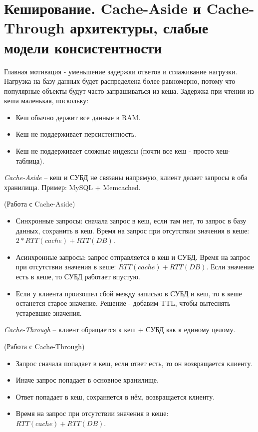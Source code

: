 \section{Кеширование. Cache-Aside и Cache-Through архитектуры, слабые модели консистентности}

Главная мотивация - уменьшение задержки ответов и сглаживание нагрузки.
Нагрузка на базу данных будет распределена более равномерно, потому что популярные объекты будут часто запрашиваться из кеша.
Задержка при чтении из кеша маленькая, поскольку:
\begin{itemize}
    \item Кеш обычно держит все данные в RAM.
    \item Кеш не поддерживает персистентность.
    \item Кеш не поддерживает сложные индексы (почти все кеш - просто хеш-таблица).
\end{itemize}

\begin{definition}
    \textit{Cache-Aside} -- кеш и СУБД не связаны напрямую, клиент делает запросы в оба хранилища. Пример: MySQL + Memcached.
\end{definition}

\begin{algorithm}(Работа с Cache-Aside)
    \begin{itemize}
        \item Синхронные запросы: сначала запрос в кеш, если там нет, то запрос в базу данных, сохранить в кеш.
            Время на запрос при отсутствии значения в кеше: $2 * RTT(cache) + RTT(DB)$.
        \item Асинхронные запросы: запрос отправляется в кеш и СУБД.
            Время на запрос при отсутствии значения в кеше: $RTT(cache) + RTT(DB)$.
            Если значение есть в кеше, то СУБД работает впустую.
        \item Если у клиента произошел сбой между записью в СУБД и кеш, то в кеше останется старое значение.
            Решение - добавим TTL, чтобы вытеснять устаревшие значения.
    \end{itemize}
\end{algorithm}

\begin{definition}
    \textit{Cache-Through} -- клиент обращается к кеш + СУБД как к единому целому.
\end{definition}

\begin{algorithm}(Работа с Cache-Through)
    \begin{itemize}
        \item Запрос сначала попадает в кеш, если ответ есть, то он возвращается клиенту.
        \item Иначе запрос попадает в основное хранилище.
        \item Ответ попадает в кеш, сохраняется в нём, возвращается клиенту.
        \item Время на запрос при отсутствии значения в кеше: $RTT(cache) + RTT(DB)$.
    \end{itemize}
\end{algorithm}

